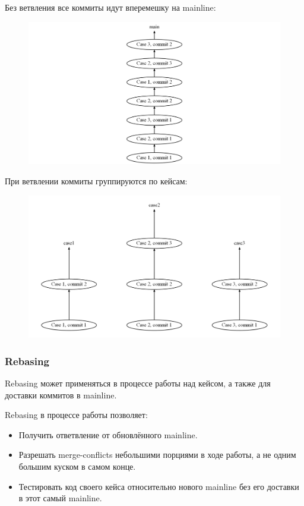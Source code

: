 \documentclass[10pt, a5paper]{article}
\begin{document}
Без ветвления все коммиты идут вперемешку на mainline:
\begin{figure}[h!]
  \centering
  \includegraphics[scale=0.2]{02_2014_only-main.png}
\end{figure}

При ветвлении коммиты группируются по кейсам:
\begin{figure}[h!]
  \centering
  \includegraphics[scale=0.2]{02_2014_branches.png}
\end{figure}

\subsubsection*{Rebasing}

Rebasing может применяться в процессе работы над кейсом, а также для доставки коммитов в mainline.

Rebasing в процессе работы позволяет:

\begin{itemize}
  \item Получить ответвление от обновлённого mainline.
  \item Разрешать merge-conflicts небольшими порциями в ходе работы, а не одним большим куском в самом конце.
  \item Тестировать код своего кейса относительно нового mainline без его доставки в этот самый mainline.
\end{itemize}
\end{document}
